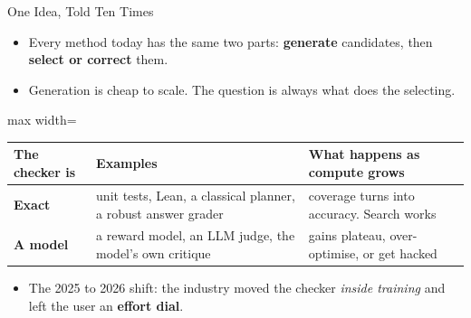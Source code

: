 \begin{frame}{One Idea, Told Ten Times}
    \begin{itemize}\itemsep0.4em
        \item Every method today has the same two parts: \textbf{generate} candidates, then \textbf{select or correct} them.
        \item Generation is cheap to scale. The question is always what does the selecting.
    \end{itemize}
    \begin{center}
    \small
    \renewcommand{\arraystretch}{1.15}
    \begin{adjustbox}{max width=\linewidth}\begin{tabular}{>{\raggedright\arraybackslash}p{4.2cm}>{\raggedright\arraybackslash}p{4.6cm}>{\raggedright\arraybackslash}p{4.6cm}}
        \toprule
        \textbf{The checker is} & \textbf{Examples} & \textbf{What happens as compute grows} \\
        \midrule
        \rowcolor{KAUSTcyan!12} \textbf{Exact} & unit tests, Lean, a classical planner, a robust answer grader & coverage turns into accuracy. Search works \\
        \textbf{A model} & a reward model, an LLM judge, the model's own critique & gains plateau, over-optimise, or get hacked \\
        \bottomrule
    \end{tabular}\end{adjustbox}
    \end{center}
    \begin{itemize}\itemsep0.4em
        \item The 2025 to 2026 shift: the industry moved the checker \emph{inside training} and left the user an \textbf{effort dial}.
    \end{itemize}
    \vspace{0.1em}
\end{frame}

